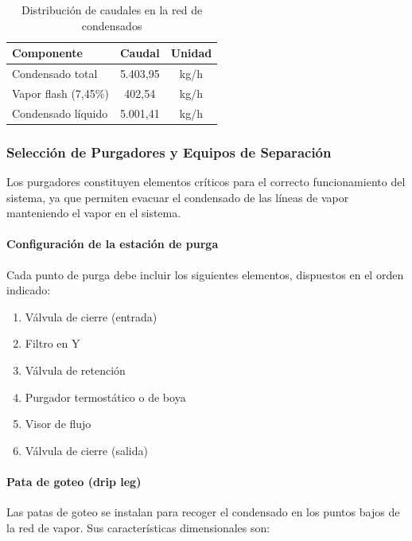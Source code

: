 \begin{table}[H]
	\centering
	\caption{Distribución de caudales en la red de condensados}
	\label{tab:caudales-condensados}
	\begin{tabular}{lcc}
		\toprule
		\textbf{Componente}    & \textbf{Caudal} & \textbf{Unidad} \\
		\midrule
		Condensado total       & 5.403{,}95      & kg/h            \\
		Vapor flash (7{,}45\%) & 402{,}54        & kg/h            \\
		Condensado líquido     & 5.001{,}41      & kg/h            \\
		\bottomrule
	\end{tabular}
\end{table}

\subsubsection{Selección de Purgadores y Equipos de Separación}
\label{subsubsec:purgadores-separacion}

Los purgadores constituyen elementos críticos para el correcto funcionamiento del sistema, ya que permiten evacuar el condensado de las líneas de vapor manteniendo el vapor en el sistema.

\paragraph{Configuración de la estación de purga}

Cada punto de purga debe incluir los siguientes elementos, dispuestos en el orden indicado:

\begin{enumerate}[noitemsep]
	\item Válvula de cierre (entrada)
	\item Filtro en Y
	\item Válvula de retención
	\item Purgador termostático o de boya
	\item Visor de flujo
	\item Válvula de cierre (salida)
\end{enumerate}

\paragraph{Pata de goteo (drip leg)}

Las patas de goteo se instalan para recoger el condensado en los puntos bajos de la red de vapor. Sus características dimensionales son:

